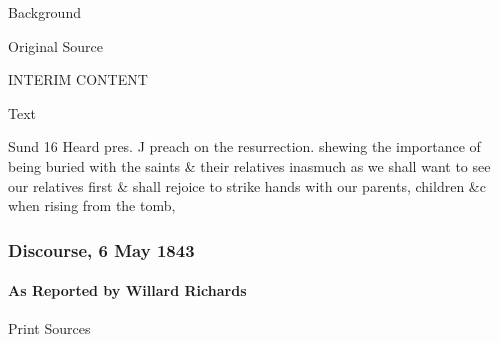 				\begin{description}
					\item[Background]
				\end{description}
				
				
				\begin{description}
					\item[Original Source]
				\end{description}
				
					INTERIM CONTENT
				
				
				\begin{description}
					\item[Text]
				\end{description}
				
					Sund 16 Heard pres. J preach on the resurrection. shewing the importance of being buried with the saints \& their relatives inasmuch as we shall want to see our relatives first \& shall rejoice to strike hands with our parents, children \&c when rising from the tomb,
					
		\subsubsection{Discourse, 6 May 1843}
			\label{EMS-1843-JS-6-MAY-1843}
			
			\paragraph{As Reported by Willard Richards}
				\label{EMS-1843-JS-6-MAY-1843-WR}
			
				\begin{description}
					\item[Print Sources]
				\end{description}

